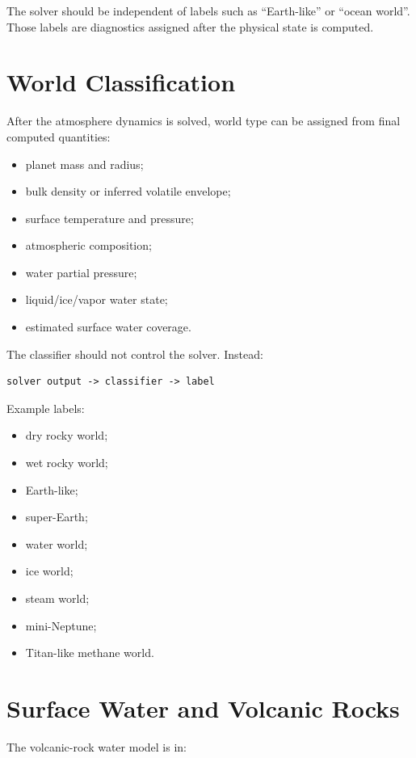 \documentclass[11pt]{article}
\begin{document}
The solver should be independent of labels such as ``Earth-like'' or ``ocean
world''. Those labels are diagnostics assigned after the physical state is
computed.

\section{World Classification}

After the atmosphere dynamics is solved, world type can be assigned from final
computed quantities:

\begin{itemize}
  \item planet mass and radius;
  \item bulk density or inferred volatile envelope;
  \item surface temperature and pressure;
  \item atmospheric composition;
  \item water partial pressure;
  \item liquid/ice/vapor water state;
  \item estimated surface water coverage.
\end{itemize}

The classifier should not control the solver. Instead:

\begin{lstlisting}
solver output -> classifier -> label
\end{lstlisting}

Example labels:

\begin{itemize}
  \item dry rocky world;
  \item wet rocky world;
  \item Earth-like;
  \item super-Earth;
  \item water world;
  \item ice world;
  \item steam world;
  \item mini-Neptune;
  \item Titan-like methane world.
\end{itemize}

\section{Surface Water and Volcanic Rocks}

The volcanic-rock water model is in:
\end{document}
